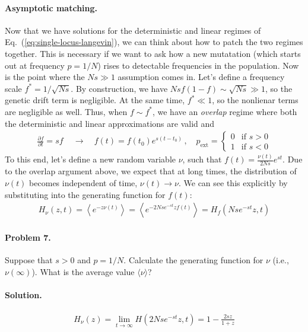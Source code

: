 \documentclass[11pt]{article}
\newcommand{\eq}[1]{Eq.~(\ref{#1})}
\begin{document}
\paragraph{Asymptotic matching.}  Now that we have solutions for the deterministic and linear regimes of \eq{eq:single-locus-langevin}, we can think about how to patch the two regimes together. This is necessary if we want to ask how a new mutatation (which starts out at frequency $p=1/N$) rises to detectable frequencies in the population. Now is the point where the $Ns \gg 1$ assumption comes in. Let's define a frequency scale $f^* = 1/\sqrt{Ns}$. By construction, we have $Ns f(1-f) \sim \sqrt{Ns} \gg 1$, so the genetic drift term is negligible. At the same time, $f^* \ll 1$, so the nonlienar terms are negligible as well. Thus, when $f \sim f^*$, we have an \emph{overlap} regime where both the deterministic and linear approximations are valid and
\begin{align}
\frac{\partial f}{\partial t} = s f \, \quad \to \quad f(t) = f(t_0) e^{s(t-t_0)}  \, , \quad p_\mathrm{ext} = \begin{cases}
0 & \text{if $s > 0$} \\
1 & \text{if $s < 0$}
\end{cases}
\end{align}
To this end, let's define a new random variable $\nu$, such that $f(t) = \frac{\nu(t)}{2Ns} e^{st}$. Due to the overlap argument above, we expect that at long times, the distribution of $\nu(t)$ becomes independent of time, $\nu(t) \to \nu$. We can see this explicitly by substituting into the generating function for $f(t)$:
\begin{align}
H_{\nu}(z,t) = \left\langle e^{-z \nu(t)} \right\rangle = \left\langle e^{-2Ns e^{-st} z f(t)} \right\rangle = H_f(Nse^{-st}z,t) 
\end{align}

\paragraph{Problem 7.} Suppose that $s > 0$ and $p=1/N$. Calculate the generating function for $\nu$ (i.e., $\nu(\infty)$). What is the average value $\langle \nu \rangle$?

\paragraph{Solution.}  
\begin{align}
H_\nu(z) = \lim_{t \to \infty} H(2 Ns e^{-st} z ,t) = 1 - \frac{2s z}{1+z}  
\end{align}
\end{document}
